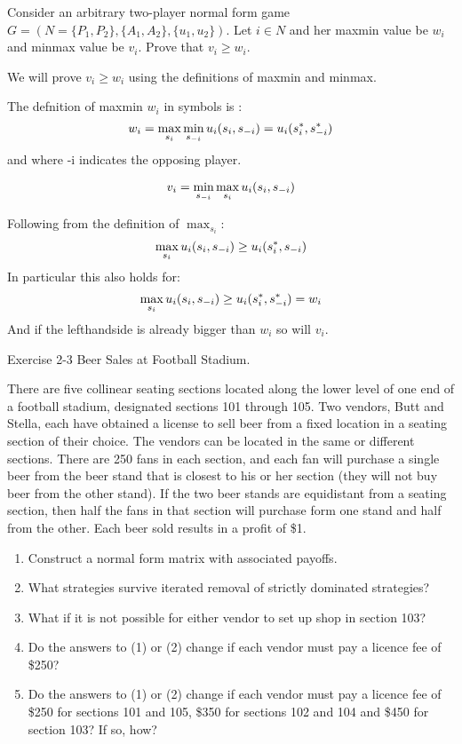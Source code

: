 \documentclass[../main.tex]{subfiles}
\begin{document}
\begin{question}
	Consider an arbitrary two-player normal form game $G = (N=\{P_1,P_2\},\{A_1,A_2\},\{u_1,u_2\})$.
	Let $i \in N$ and her maxmin value be $w_i$ and minmax value be $v_i$. Prove that $v_i \geq w_i$.
\end{question}

\begin{solution}
	We will prove $v_i \geq w_i$ using the definitions of maxmin and minmax.

	The defnition of maxmin $w_i$ in symbols is :
	\begin{equation}
		w_i = \max_{s_i} \min_{s_{\--i}} u_i(s_i,s_{\--i}) = u_i(s_{i}^{*},s_{-i}^{*})
	\end{equation}
	and where \--i indicates the opposing player. 

	$$v_i = \min_{s_{\--i}} \max_{s_i} u_i(s_i,s_{\--i})$$

	Following from the definition of $\max_{s_i}$:
	$$\max_{s_i} u_i(s_i,s_{\--i}) \geq u_i(s_i^{*}, s_{\--i})$$
	In particular this also holds for:
	$$\max_{s_i} u_i(s_i,s_{\--i}) \geq u_i(s_i^{*},s_{\--i}^{*}) = w_i$$
	And if the lefthandside is already bigger than $w_i$ so will $v_i$.
\end{solution}

\begin{question}
Exercise 2-3 Beer Sales at Football Stadium.

There are five collinear seating sections located along the lower level of one end of a football stadium, designated sections 101 through 105. Two vendors, Butt and Stella, each have obtained a license to sell beer from a fixed location in a seating section of their choice. The vendors can be located in the same or different sections. There are 250 fans in each section, and each fan will purchase a single beer from the beer stand that is closest to his or her section (they will not buy beer from the other stand). If the two beer stands are
equidistant from a seating section, then half the fans in that section will purchase form one stand and half from the other. Each beer sold results in a profit of \$1.

	\begin{enumerate}
		\item Construct a normal form matrix with associated payoffs.
		\item What strategies survive iterated removal of strictly dominated strategies?
		\item What if it is not possible for either vendor to set up shop in section 103?
		\item Do the answers to (1) or (2) change if each vendor must pay a licence fee of \$250?
		\item Do the answers to (1) or (2) change if each vendor must pay a licence fee of \$250 for sections 101 and 105, \$350 for sections 102 and 104 and \$450 for section 103? If so, how?
	\end{enumerate}

\end{question}
\end{document}
